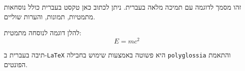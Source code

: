 \documentclass[12pt]{article} %
\begin{document}
זהו מסמך לדוגמה עם תמיכה מלאה בעברית. ניתן לכתוב כאן טקסט בעברית כולל נוסחאות מתמטיות, תמונות, והערות שוליים.

להלן דוגמה לנוסחה מתמטית:
\[
E = mc^2
\]

תיבה בעברית ב-\texttt{LaTeX} היא פשוטה באמצעות שימוש בחבילה \texttt{polyglossia} והתאמת הפונטים.
\end{document}
